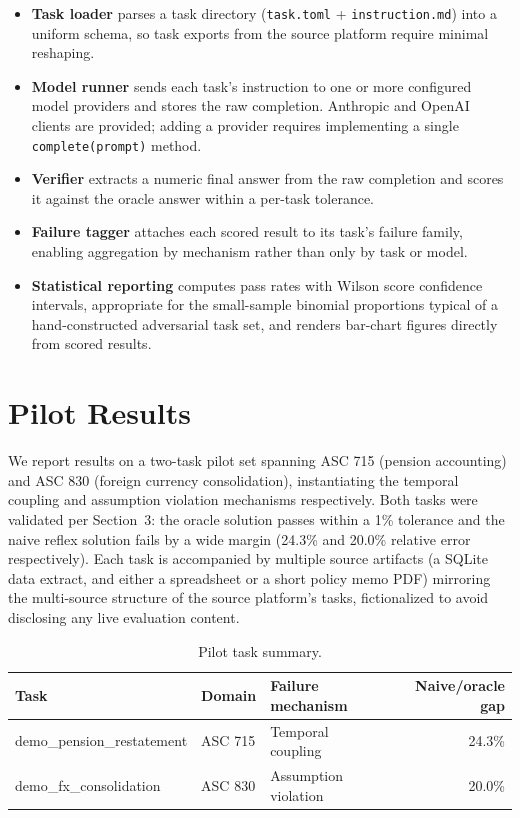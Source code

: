 \documentclass[11pt]{article}
\begin{document}
\begin{itemize}
  \item \textbf{Task loader} parses a task directory (\texttt{task.toml}
    + \texttt{instruction.md}) into a uniform schema, so task exports
    from the source platform require minimal reshaping.
  \item \textbf{Model runner} sends each task's instruction to one or
    more configured model providers and stores the raw completion.
    Anthropic and OpenAI clients are provided; adding a provider
    requires implementing a single \texttt{complete(prompt)} method.
  \item \textbf{Verifier} extracts a numeric final answer from the raw
    completion and scores it against the oracle answer within a
    per-task tolerance.
  \item \textbf{Failure tagger} attaches each scored result to its
    task's failure family, enabling aggregation by mechanism rather
    than only by task or model.
  \item \textbf{Statistical reporting} computes pass rates with Wilson
    score confidence intervals, appropriate for the small-sample
    binomial proportions typical of a hand-constructed adversarial task
    set, and renders bar-chart figures directly from scored results.
\end{itemize}

\section{Pilot Results}
\label{sec:pilot}

We report results on a two-task pilot set spanning ASC 715 (pension
accounting) and ASC 830 (foreign currency consolidation), instantiating
the temporal coupling and assumption violation mechanisms respectively.
Both tasks were validated per Section~3: the oracle solution passes
within a 1\% tolerance and the naive reflex solution fails by a wide
margin (24.3\% and 20.0\% relative error respectively). Each task is
accompanied by multiple source artifacts (a SQLite data extract, and
either a spreadsheet or a short policy memo PDF) mirroring the
multi-source structure of the source platform's tasks, fictionalized to
avoid disclosing any live evaluation content.

\begin{table}[h]
\centering
\caption{Pilot task summary.}
\label{tab:pilot-tasks}
\begin{tabular}{lllr}
\toprule
Task & Domain & Failure mechanism & Naive/oracle gap \\
\midrule
demo\_pension\_restatement & ASC 715 & Temporal coupling & 24.3\% \\
demo\_fx\_consolidation & ASC 830 & Assumption violation & 20.0\% \\
\bottomrule
\end{tabular}
\end{table}
\end{document}
